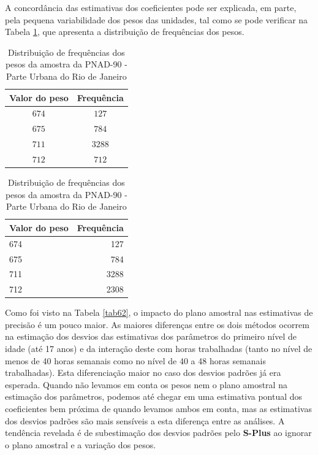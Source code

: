 \documentclass[]{book}
\numberwithin{example}{chapter}
\numberwithin{remark}{chapter}
\numberwithin{definition}{chapter}
\begin{document}
A concordância das estimativas dos coeficientes pode ser explicada, em
parte, pela pequena variabilidade dos pesos das unidades, tal como se
pode verificar na Tabela \ref{tab66}, que apresenta a distribuição de
frequências dos pesos.

\begin{center}
\begin{table}[tbp] \centering%
\caption{Distribuição de frequências dos pesos da amostra da PNAD-90 - Parte
Urbana do Rio de Janeiro}\bigskip \label{tab66} 
\begin{tabular}{|c|c|}
\hline\hline
Valor do peso & Frequência \\ \hline\hline
$674$ & $127$ \\ 
$675$ & $784$ \\ 
$711$ & $3288$ \\ 
$712$ & $712$ \\ \hline\hline
\end{tabular}
\end{table}%
\end{center}

\begin{table}

\caption{\label{tab:pesofreq}Distribuição de frequências dos pesos da amostra da PNAD-90 - Parte
Urbana do Rio de Janeiro}
\centering
\begin{tabular}[t]{lr}
\toprule
Valor do peso & Frequência\\
\midrule
674 & 127\\
675 & 784\\
711 & 3288\\
712 & 2308\\
\bottomrule
\end{tabular}
\end{table}

Como foi visto na Tabela \ref{tab62}, o impacto do plano amostral nas
estimativas de precisão é um pouco maior. As maiores diferenças entre os
dois métodos ocorrem na estimação dos desvios das estimativas dos
parâmetros do primeiro nível de idade (até 17 anos) e da interação deste
com horas trabalhadas (tanto no nível de menos de 40 horas semanais como
no nível de 40 a 48 horas semanais trabalhadas). Esta diferenciação
maior no caso dos desvios padrões já era esperada. Quando não levamos em
conta os pesos nem o plano amostral na estimação dos parâmetros, podemos
até chegar em uma estimativa pontual dos coeficientes bem próxima de
quando levamos ambos em conta, mas as estimativas dos desvios padrões
são mais sensíveis a esta diferença entre as análises. A tendência
revelada é de subestimação dos desvios padrões pelo \textbf{S-Plus} ao
ignorar o plano amostral e a variação dos pesos.
\end{document}
